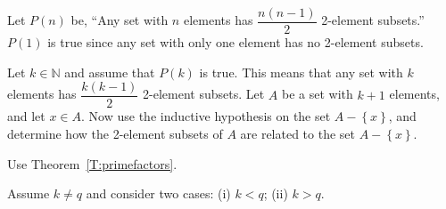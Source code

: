 \begin{list}{\bf{\ref{exer:2elementsubsets}.}}
\item Let $P ( n )$ be, ``Any set with $n$ elements has 
$\dfrac{n ( n - 1 )}{2}$ 2-element subsets.''  $P ( 1 )$ is true since any set with only one element has no 2-element subsets.

Let $k \in \mathbb{N}$ and assume that $P ( k )$ is true.  This means that any set with $k$ elements has $\dfrac{k ( k - 1 )}{2}$ 2-element subsets.  Let $A$ be a set with $k + 1$ elements, and let $x \in A$. Now use the inductive hypothesis on the set 
$A - \left\{ x \right\}$, and determine how the 2-element subsets of $A$ are related to the set 
$A - \left\{ x \right\}$. 

\end{list}





\begin{list}{\bf{\ref{exer:specialFTA}.}}
\item \begin{list}{\bf{(a)}}
\item Use Theorem~\ref{T:primefactors}.
\end{list}
\end{list}

\begin{list}{}
\item \begin{list}{\bf{(b)}}
\item  Assume $k \ne q$ and consider two cases:  (i) $k < q$; (ii) $k > q$.
\end{list}
\end{list}




\hbreak
\renewcommand{\labelenumi}{\textbf{\arabic{enumi}.}}


\endinput


